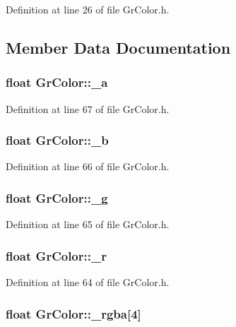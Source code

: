 Definition at line 26 of file GrColor.h.

\subsection{Member Data Documentation}
\hypertarget{class_gr_color_39c59fb903350ca00983d5d8d4e85f74}{
\subsubsection[{\_\-a}]{\setlength{\rightskip}{0pt plus 5cm}float {\bf GrColor::\_\-a}}}
\label{class_gr_color_39c59fb903350ca00983d5d8d4e85f74}




Definition at line 67 of file GrColor.h.\hypertarget{class_gr_color_cd11b3fe02e4ce91d5f7aae9c738414f}{
\subsubsection[{\_\-b}]{\setlength{\rightskip}{0pt plus 5cm}float {\bf GrColor::\_\-b}}}
\label{class_gr_color_cd11b3fe02e4ce91d5f7aae9c738414f}




Definition at line 66 of file GrColor.h.\hypertarget{class_gr_color_ae8f07a4002a1da650c1f5265e34fca3}{
\subsubsection[{\_\-g}]{\setlength{\rightskip}{0pt plus 5cm}float {\bf GrColor::\_\-g}}}
\label{class_gr_color_ae8f07a4002a1da650c1f5265e34fca3}




Definition at line 65 of file GrColor.h.\hypertarget{class_gr_color_d68114b22f656f96d7e5bc6e49024bba}{
\subsubsection[{\_\-r}]{\setlength{\rightskip}{0pt plus 5cm}float {\bf GrColor::\_\-r}}}
\label{class_gr_color_d68114b22f656f96d7e5bc6e49024bba}




Definition at line 64 of file GrColor.h.\hypertarget{class_gr_color_a50723bde5e52e3f4146b2b12b9da33d}{
\subsubsection[{\_\-rgba}]{\setlength{\rightskip}{0pt plus 5cm}float {\bf GrColor::\_\-rgba}\mbox{[}4\mbox{]}}}
\label{class_gr_color_a50723bde5e52e3f4146b2b12b9da33d}




